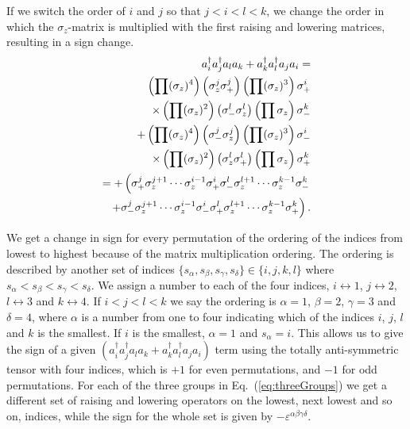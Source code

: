 \documentclass[aps,pra,twocolumn,floatfix]{revtex4}
\begin{document}
If we switch the order of $i$ and $j$ so that $j<i<l<k$, we change the
order in which the $\sigma_z$-matrix is multiplied with the first
raising and lowering matrices, resulting in a sign change.
\begin{eqnarray}
a^\dag_i a^\dag_j a_l a_k  + a_k^\dag a_l^\dag a_j a_i
=\notag\\
\left(\prod (\sigma_z)^4\right) \left(\sigma_z^j \sigma_+^j\right)
\left(\prod (\sigma_z)^3\right) \sigma_+^i \notag \\
\times 
\left(\prod (\sigma_z)^2\right) \left(\sigma_-^l \sigma_z^l \right)
\left(\prod \sigma_z\right) \sigma_-^k \notag \\
 +\left(\prod (\sigma_z)^4\right) \left(\sigma_-^j\sigma_z^j\right)
\left(\prod (\sigma_z)^3\right) \sigma_-^i \notag \\
\times 
\left(\prod (\sigma_z)^2\right) \left(\sigma_z^l\sigma_+^l \right)
\left(\prod \sigma_z\right) \sigma_+^k \notag \\
=+\left(\sigma_+^j \sigma_z^{j+1}\cdots \sigma_z^{i-1} \sigma_+^i
\sigma_-^l \sigma_z^{l+1}\cdots \sigma_z^{k-1}\sigma_-^k\right.
\notag\\
 \left.+ \sigma_-^j \sigma_z^{j+1}\cdots \sigma_z^{i-1} \sigma_-^i
\sigma_+^l \sigma_z^{l+1}\cdots \sigma_z^{k-1}\sigma_+^k\right).
\end{eqnarray}






We get a change in sign for every permutation of the ordering
of the indices from lowest to highest because of the matrix
multiplication ordering. The ordering is described by another set of
indices \newline $\{s_\alpha, s_\beta, s_\gamma, s_\delta\} \in \{i, j, k, l\}$
where  
$s_\alpha< s_\beta< s_\gamma< s_\delta$. We assign a number to each of
the four indices, $i\leftrightarrow 1$, $j\leftrightarrow 2$,
$l\leftrightarrow 3$ and $k\leftrightarrow 4$. If $i<j<l<k$ we say the
ordering is $\alpha =1$, $\beta =2$, $\gamma=3$ and $\delta=4$, where
$\alpha$ is a number from one to four indicating which of the indices $i$, $j$,
$l$ and $k$ is the smallest. If $i$ is the smallest, $\alpha=1$ and
$s_\alpha= i$. This allows us to give the sign of a
given $(a^\dag_i a^\dag_j a_l a_k + a_k^\dag a_l^\dag a_j a_i)$ 
term using the totally anti-symmetric tensor with
four indices, which is $+1$ for even permutations, and $-1$ for odd
permutations. For each of the three groups in Eq.~(\ref{eq:threeGroups})
we get a different set of raising and lowering operators on the
lowest, next lowest and so on, indices, while the sign for the whole
set is given by $-\varepsilon^{\alpha\beta\gamma\delta}$.
\end{document}
